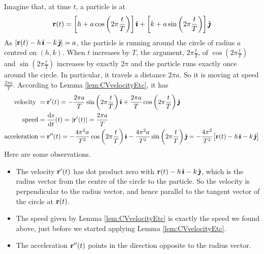 \begin{eg}\label{eg:velAccel}
Imagine that, at time $t$, a particle is at 
\begin{equation*}
\mathbf{r}(t) = \left[h+a\cos\left(2\pi\frac{t}{T}\right)\right]\hat{\pmb{\imath}}
            +\left[k+a\sin\left(2\pi\frac{t}{T}\right)\right]\hat{\pmb{\jmath}}
\end{equation*}
As $|\mathbf{r}(t) -h\,\hat{\pmb{\imath}}-k\,\hat{\pmb{\jmath}}| = a$, the particle is running around the circle of radius $a$ centred on $(h,k)$. When $t$ increases by $T$, the argument, $2\pi\frac{t}{T}$, of $\cos\left(2\pi\tfrac{t}{T}\right)$ and 
$\sin\left(2\pi\tfrac{t}{T}\right)$ increases by exactly $2\pi$ and the particle runs exactly once around the circle. In particular, it travels a distance 
$2\pi a$. So it is moving at speed  $\frac{2\pi a}{T}$. 
According to Lemma \ref{lem:CVvelocityEtc}, it has 
\begin{align*}
\text{velocity }
       &=\vr'(t)=-\frac{2\pi a}{T}\sin\left(2\pi\frac{t}{T}\right)\hi
            +\frac{2\pi a}{T}\cos\left(2\pi\frac{t}{T}\right)\hj
      \\
\text{speed}
       &= \diff{s}{t}(t)=|\vr'(t)|=\frac{2\pi a}{T} \\
\text{acceleration}
       &=\vr''(t)
        =-\frac{4\pi^2 a}{T^2}\cos\left(2\pi\frac{t}{T}\right)\hi
            -\frac{4\pi^2 a}{T^2}\sin\left(2\pi\frac{t}{T}\right)\hj 
        = - \frac{4\pi^2}{T^2}\big[\vr(t) -h\,\hi-k\,\hj\big]
\end{align*}
Here are some observations.
\begin{itemize}
\item 
The velocity $\mathbf{r}'(t)$ has dot product zero with $\mathbf{r}(t) -h\,\hat{\pmb{\imath}}-k\,\hat{\pmb{\jmath}}$, which is the radius vector from the centre of the circle to the particle.
So the velocity is perpendicular to the radius vector, and hence parallel to the 
tangent vector of the circle at $\mathbf{r}(t)$.
\item 
The speed given by Lemma \ref{lem:CVvelocityEtc} is exactly the speed
we found above, just before we started applying Lemma \ref{lem:CVvelocityEtc}.
\item 
The acceleration $\mathbf{r}''(t)$ points in the direction opposite to the radius 
vector.
\end{itemize}


\end{eg}
